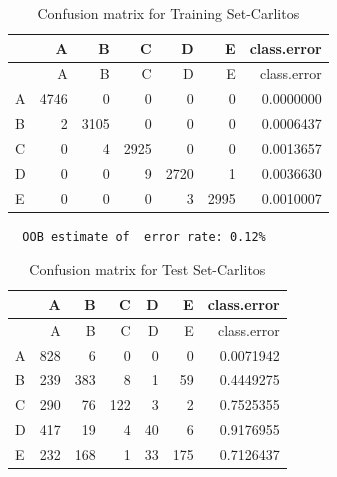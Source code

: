 \documentclass[12pt,twoside]{reedthesis}
\begin{document}
  \begin{Shaded}
  \begin{Highlighting}[]
  \NormalTok{(}\NormalTok{)}
  
  \StringTok{ }\NormalTok{wl2[wl2$user_name ==}\StringTok{ }\NormalTok{subjects[}\NormalTok{], ]}
  \StringTok{ }\NormalTok{wl2[wl2$user_name !=}\StringTok{ }\NormalTok{subjects[}\NormalTok{], ]}
  \StringTok{ }\NormalTok{(} \NormalTok{OtherSubs2[, }\NormalTok{:}\NormalTok{], } 
                                  \NormalTok{Sub2[, }\NormalTok{:}\NormalTok{], }
                                  
                                  \NormalTok{)}
  \end{Highlighting}
  \end{Shaded}
  
  \begin{longtable}[c]{@{}lrrrrrr@{}}
  \caption{Confusion matrix for Training Set-Carlitos}\tabularnewline
  \toprule
  & A & B & C & D & E & class.error\tabularnewline
  \midrule
  \endfirsthead
  \toprule
  & A & B & C & D & E & class.error\tabularnewline
  \midrule
  \endhead
  A & 4746 & 0 & 0 & 0 & 0 & 0.0000000\tabularnewline
  B & 2 & 3105 & 0 & 0 & 0 & 0.0006437\tabularnewline
  C & 0 & 4 & 2925 & 0 & 0 & 0.0013657\tabularnewline
  D & 0 & 0 & 9 & 2720 & 1 & 0.0036630\tabularnewline
  E & 0 & 0 & 0 & 3 & 2995 & 0.0010007\tabularnewline
  \bottomrule
  \end{longtable}
  
  \begin{verbatim}
  OOB estimate of  error rate: 0.12%
  \end{verbatim}
  
  \begin{longtable}[c]{@{}lrrrrrr@{}}
  \caption{Confusion matrix for Test Set-Carlitos}\tabularnewline
  \toprule
  & A & B & C & D & E & class.error\tabularnewline
  \midrule
  \endfirsthead
  \toprule
  & A & B & C & D & E & class.error\tabularnewline
  \midrule
  \endhead
  A & 828 & 6 & 0 & 0 & 0 & 0.0071942\tabularnewline
  B & 239 & 383 & 8 & 1 & 59 & 0.4449275\tabularnewline
  C & 290 & 76 & 122 & 3 & 2 & 0.7525355\tabularnewline
  D & 417 & 19 & 4 & 40 & 6 & 0.9176955\tabularnewline
  E & 232 & 168 & 1 & 33 & 175 & 0.7126437\tabularnewline
  \bottomrule
  \end{longtable}
  
\end{document}
